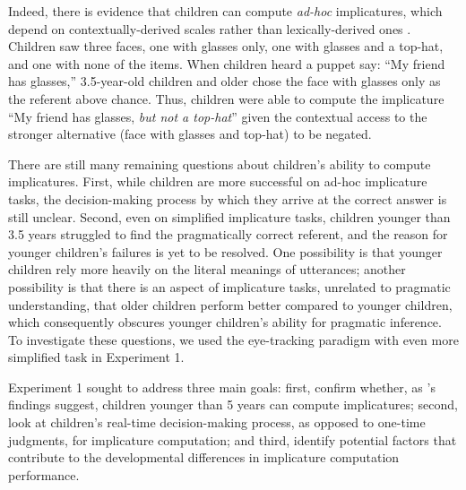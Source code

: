 \documentclass[10pt,letterpaper]{article}
\begin{document}
Indeed, there is evidence that children can compute \emph{ad-hoc} implicatures, which depend on contextually-derived scales rather than lexically-derived ones \cite{stillerLLD}. Children saw three faces, one with glasses only, one with glasses and a top-hat, and one with none of the items. When children heard a puppet say: ``My friend has glasses,'' 3.5-year-old children and older chose the face with glasses only as the referent above chance. Thus, children were able to compute the implicature ``My friend has glasses, \emph{but not a top-hat}'' given the contextual access to the stronger alternative (face with glasses and top-hat) to be negated. 

There are still many remaining questions about children's ability to compute implicatures. First, while children are more successful on ad-hoc implicature tasks, the decision-making process by which they arrive at the correct answer is still unclear. Second, even on simplified implicature tasks, children younger than 3.5 years struggled to find the pragmatically correct referent, and the reason for younger children's failures is yet to be resolved. One possibility is that younger children rely more heavily on the literal meanings of utterances; another possibility is that there is an aspect of implicature tasks, unrelated to pragmatic understanding, that older children perform better compared to younger children, which consequently obscures younger children's ability for pragmatic inference. To investigate these questions, we used the eye-tracking paradigm with even more simplified task in Experiment 1.


Experiment 1 sought to address three main goals: first, confirm whether, as 's findings suggest, children younger than 5 years can compute implicatures; second, look at children's real-time decision-making process, as opposed to one-time judgments, for implicature computation; and third, identify potential factors that contribute to the developmental differences in implicature computation performance.
\end{document}
